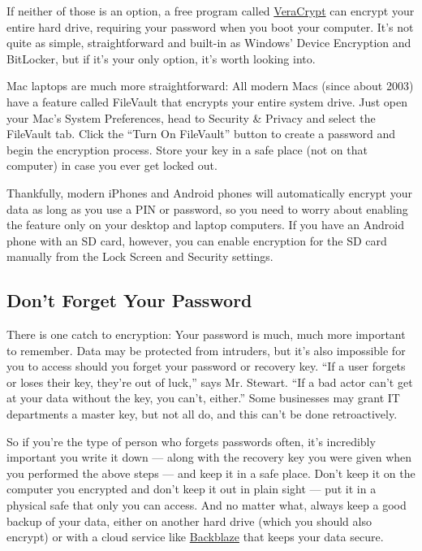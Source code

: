 If neither of those is an option, a free program called
\href{https://www.veracrypt.fr/}{VeraCrypt} can encrypt your entire hard
drive, requiring your password when you boot your computer. It's not
quite as simple, straightforward and built-in as Windows' Device
Encryption and BitLocker, but if it's your only option, it's worth
looking into.

Mac laptops are much more straightforward: All modern Macs (since about
2003) have a feature called FileVault that encrypts your entire system
drive. Just open your Mac's System Preferences, head to Security \&
Privacy and select the FileVault tab. Click the ``Turn On FileVault''
button to create a password and begin the encryption process. Store your
key in a safe place (not on that computer) in case you ever get locked
out.

Thankfully, modern iPhones and Android phones will automatically encrypt
your data as long as you use a PIN or password, so you need to worry
about enabling the feature only on your desktop and laptop computers. If
you have an Android phone with an SD card, however, you can enable
encryption for the SD card manually from the Lock Screen and Security
settings.

\hypertarget{dont-forget-your-password}{%
\subsection{Don't Forget Your
Password}\label{dont-forget-your-password}}

There is one catch to encryption: Your password is much, much more
important to remember. Data may be protected from intruders, but it's
also impossible for you to access should you forget your password or
recovery key. ``If a user forgets or loses their key, they're out of
luck,'' says Mr. Stewart. ``If a bad actor can't get at your data
without the key, you can't, either.'' Some businesses may grant IT
departments a master key, but not all do, and this can't be done
retroactively.

So if you're the type of person who forgets passwords often, it's
incredibly important you write it down --- along with the recovery key
you were given when you performed the above steps --- and keep it in a
safe place. Don't keep it on the computer you encrypted and don't keep
it out in plain sight --- put it in a physical safe that only you can
access. And no matter what, always keep a good backup of your data,
either on another hard drive (which you should also encrypt) or with a
cloud service like \href{https://www.backblaze.com/}{Backblaze} that
keeps your data secure.

